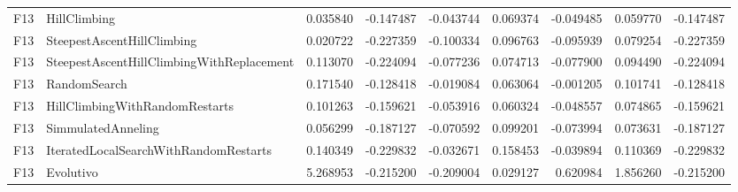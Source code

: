 \begin{tabular}{llrrrrrrr}
F13 & HillClimbing & 0.035840 & -0.147487 & -0.043744 & 0.069374 & -0.049485 & 0.059770 & -0.147487 \\
F13 & SteepestAscentHillClimbing & 0.020722 & -0.227359 & -0.100334 & 0.096763 & -0.095939 & 0.079254 & -0.227359 \\
F13 & SteepestAscentHillClimbingWithReplacement & 0.113070 & -0.224094 & -0.077236 & 0.074713 & -0.077900 & 0.094490 & -0.224094 \\
F13 & RandomSearch & 0.171540 & -0.128418 & -0.019084 & 0.063064 & -0.001205 & 0.101741 & -0.128418 \\
F13 & HillClimbingWithRandomRestarts & 0.101263 & -0.159621 & -0.053916 & 0.060324 & -0.048557 & 0.074865 & -0.159621 \\
F13 & SimmulatedAnneling & 0.056299 & -0.187127 & -0.070592 & 0.099201 & -0.073994 & 0.073631 & -0.187127 \\
F13 & IteratedLocalSearchWithRandomRestarts & 0.140349 & -0.229832 & -0.032671 & 0.158453 & -0.039894 & 0.110369 & -0.229832 \\
F13 & Evolutivo & 5.268953 & -0.215200 & -0.209004 & 0.029127 & 0.620984 & 1.856260 & -0.215200 \\
\bottomrule
\end{tabular}
